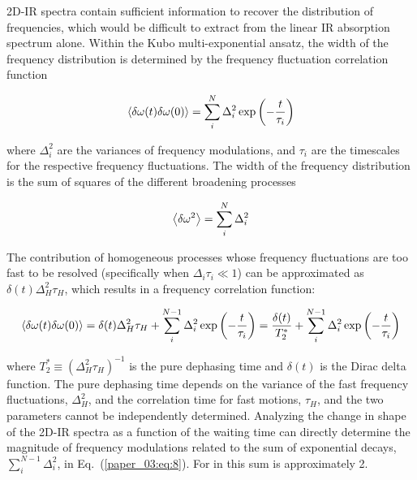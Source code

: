2D-IR spectra contain sufficient information to recover the distribution of frequencies, which would be difficult to extract from the linear IR absorption spectrum alone.\cite{Brinzer2015} Within the Kubo multi-exponential ansatz, the width of the frequency distribution is determined by the frequency fluctuation correlation function

\begin{equation}
  \label{paper_03:eq:6}
  \Braket{\delta\omega(t)\delta\omega(0)} = \sum_{i}^{N} \Delta_{i}^{2}\exp\left( - \frac{t}{\tau_{i}} \right)
\end{equation}

where \(\Delta_{i}^{2}\) are the variances of frequency modulations, and \(\tau_{i}\) are the timescales for the respective frequency fluctuations. The width of the frequency distribution is the sum of squares of the different broadening processes

\begin{equation}
  \label{paper_03:eq:7}
  \Braket{\delta\omega^{2}} = \sum_{i}^{N} \Delta_{i}^{2}
\end{equation}

The contribution of homogeneous processes whose frequency fluctuations are too fast to be resolved (specifically when \(\Delta_{i}\tau_{i} \ll 1\)) can be approximated as \(\delta(t)\Delta_{H}^{2}\tau_{H}\), which results in a frequency correlation function:

\begin{equation}
  \label{paper_03:eq:8}
  \Braket{\delta\omega(t)\delta\omega(0)} = \delta(t)\Delta_{H}^{2}\tau_{H} + \sum_{i}^{N - 1}{\Delta_{i}^{2}\exp\left( - \frac{t}{\tau_{i}} \right)} = \frac{\delta(t)}{T_{2}^{*}} + \sum_{i}^{N - 1}{\Delta_{i}^{2}\exp\left( - \frac{t}{\tau_{i}} \right)}
\end{equation}

where \(T_{2}^{*} \equiv \left( \Delta_{H}^{2}\tau_{H} \right)^{- 1}\) is the pure dephasing time and \(\delta(t)\) is the Dirac delta function. The pure dephasing time depends on the variance of the fast frequency fluctuations, \(\Delta_{H}^{2}\), and the correlation time for fast motions, \(\tau_{H}\), and the two parameters cannot be independently determined. Analyzing the change in shape of the 2D-IR spectra as a function of the waiting time can directly determine the magnitude of frequency modulations related to the sum of exponential decays, \(\sum_{i}^{N - 1}\Delta_{i}^{2}\), in Eq.~(\ref{paper_03:eq:8}). For  in \ce{[C4C1im][PF6]} this sum is approximately \SI{2}{\wavenumber}.\cite{Brinzer2015}

